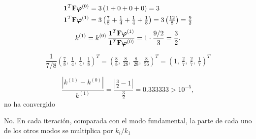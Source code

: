 \begin{align*}
	\bm{1}^T\mathbf{F}\bm{\varphi}^{(0)} &= 3\,(1 + 0 + 0 + 0) = 3\\
	\bm{1}^T\mathbf{F}\bm{\varphi}^{(1)} &= 3\left(\tfrac78 + \tfrac14 + \tfrac14 + \tfrac18\right) = 3\left(\tfrac{12}{8}\right) = \tfrac92
\end{align*}
\[
k^{(1)} = k^{(0)}\,\frac{\bm{1}^T\mathbf{F}\bm{\varphi}^{(1)}}{\bm{1}^T\mathbf{F}\bm{\varphi}^{(0)}}
= 1\cdot\frac{9/2}{3} = \frac32 .
\]

\[
\frac{1}{7/8}\left(\tfrac78,\ \tfrac14,\ \tfrac14,\ \tfrac18\right)^T
= \left(\tfrac88,\ \tfrac{8}{28},\ \tfrac{8}{28},\ \tfrac{8}{56}\right)^T
= \left(1,\ \tfrac27,\ \tfrac27,\ \tfrac17\right)^T
\]

\[
\frac{\left|k^{(1)} - k^{(0)}\right|}{k^{(1)}} = \frac{\left|\frac32 - 1\right|}{\frac32} = 0.333333 > 10^{-5},
\]
no ha convergido


No. En cada iteración, comparada con el modo fundamental, la parte de cada uno de los otros modos se multiplica
por $k_i/k_1$